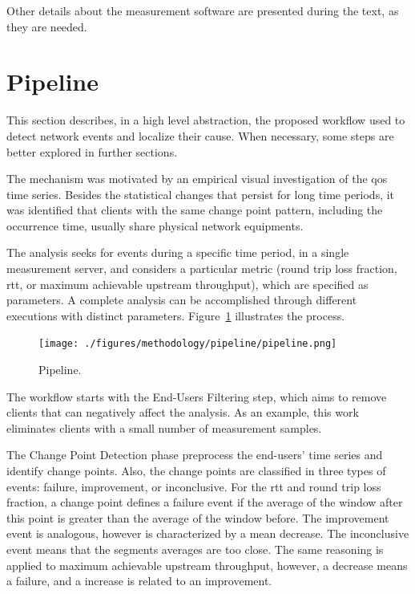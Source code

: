 Other details about the
measurement software are presented during the text, as they are needed.

\section{Pipeline}

This section describes, in a high level abstraction, the proposed workflow
used to detect network events and localize their cause. When necessary, some
steps are better explored in further sections.

The mechanism was motivated by an empirical visual investigation of the
\gls*{qos} time series.
Besides the statistical changes that persist for long time periods,
it was identified that clients with the same
change point pattern, including the occurrence time,
usually share physical network equipments.

The analysis seeks for events during a specific time period, in a single
measurement server, and considers a
particular metric (round trip loss fraction, \gls*{rtt}, or maximum achievable
upstream throughput),
which are specified as parameters.
A complete analysis can be accomplished through different
executions with distinct parameters.
Figure~\ref{fig:pipeline} illustrates the process.

\begin{figure}[H]
    \centering
    \texttt{[image: ./figures/methodology/pipeline/pipeline.png]}
    \caption{Pipeline.}
\label{fig:pipeline}
\end{figure}%

The workflow starts with the End-Users Filtering step,
which aims to remove clients that can negatively affect the analysis.
As an example, this work eliminates clients
with a small number of measurement samples.

The Change Point Detection phase preprocess the end-users' time series and
identify change points.
Also, the change points are classified in three types of events: failure,
improvement, or inconclusive. For the \gls*{rtt} and round trip loss fraction,
a change point defines a
failure event if the average of the window after this point is greater than the
average of the window before. The improvement event is analogous, however is
characterized by a mean decrease.
The inconclusive event means that the segments averages are too close.
The same reasoning is applied to maximum
achievable upstream throughput, however, a decrease means a failure, and a
increase is related to an improvement.

